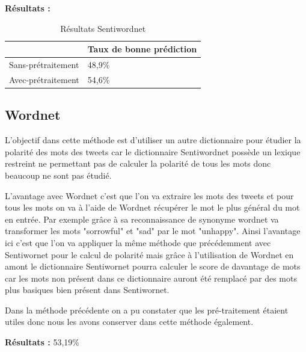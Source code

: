 \par \textbf{Résultats :} \\

\begin{table}[h!]
\centering
\caption{Résultats Sentiwordnet}
\label{my-label}
\begin{tabular}{|l|l|}
\hline
                   & Taux de bonne prédiction \\ \hline
Sans-prétraitement & 48,9\%                   \\ \hline
Avec-prétraitement & 54,6\%                   \\ \hline
\end{tabular}
\end{table}



\subsection{Wordnet}

\par L'objectif dans cette méthode est d'utiliser un autre dictionnaire pour étudier la polarité des mots des tweets car le dictionnaire Sentiwordnet possède un lexique restreint ne permettant pas de calculer la polarité de tous les mots donc beaucoup ne sont pas étudié. \\

\par L'avantage avec Wordnet c'est que l'on va extraire les mots des tweets et pour tous les mots on va à l'aide de Wordnet récupérer le mot le plus général du mot en entrée. Par exemple grâce à sa reconnaissance de synonyme wordnet va transformer les mots "sorrowful" et "sad" par le mot "unhappy". Ainsi l'avantage ici c'est que l'on va appliquer la même méthode que précédemment avec Sentiwornet pour le calcul de polarité mais grâce à l'utilisation de Wordnet en amont le dictionnaire Sentiwornet pourra calculer le score de davantage de mots car les mots non présent dans ce dictionnaire auront été remplacé par des mots plus basiques bien présent dans Sentiwornet. \\ 

\par Dans la méthode précédente on a pu constater que les pré-traitement étaient utiles donc nous les avons conserver dans cette méthode également. \\

\par\textbf{ Résultats : } 53,19\%

